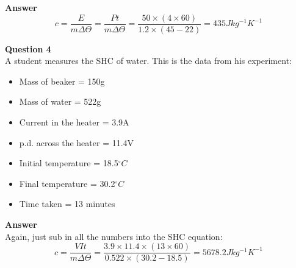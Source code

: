 \documentclass{article}
\begin{document}
\textbf{Answer}\\
\[
	c = \frac{E}{m \Delta \Theta}
	= \frac{Pt}{m \Delta \Theta}
	= \frac{50 \times (4 \times 60)}{1.2 \times (45-22)}
	= 435 Jkg^{-1}K^{-1}
\]

\textbf{Question 4}\\
A student measures the SHC of water. This is the data from his experiment:
\begin{multicols}{2}
	\begin{itemize}
		\item	Mass of beaker = 150g
		\item Mass of water = 522g
		\item Current in the heater = 3.9A
		\item p.d. across the heater = 11.4V
		\item Initial temperature = 18.5$^{\circ}C$
		\item Final temperature = 30.2$^{\circ}C$
		\item Time taken = 13 minutes
	\end{itemize}
\end{multicols}

\textbf{Answer}\\
Again, just sub in all the numbers into the SHC equation:
\[
	c = \frac{VIt}{m \Delta \Theta}
	= \frac{3.9 \times 11.4 \times (13 \times 60)}{0.522 \times (30.2-18.5)}
	= 5678.2 Jkg^{-1}K^{-1}
\]
\end{document}
